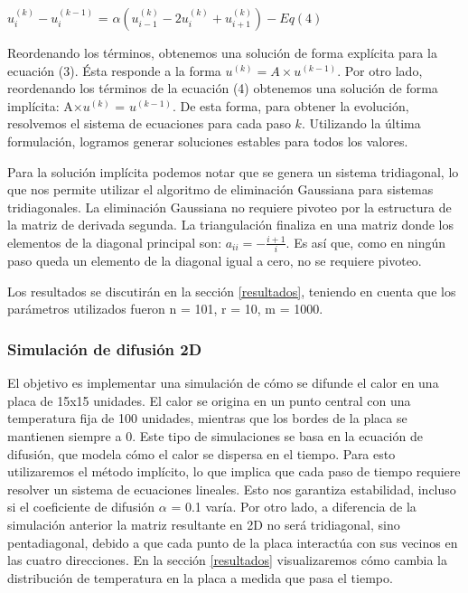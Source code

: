     \begin{center}
      $u_i^{(k)} - u_i^{(k-1)}$ = $\alpha(u_{i-1}^{(k)} - 2u_i^{(k)} + u_{i+1}^{(k)}) - Eq (4)$
    \end{center}

    Reordenando los términos, obtenemos una solución de forma explícita para la ecuación (3). Ésta responde a la forma $u^{(k)} = A \times u^{(k-1)}$. Por otro lado, reordenando los términos de la ecuación (4) obtenemos una solución de forma implícita: A$\times u^{(k)}$ = $u^{(k-1)}$. De esta forma, para obtener la evolución, resolvemos el sistema de ecuaciones para cada paso $k$.
    Utilizando la última formulación, logramos generar soluciones estables para todos los valores.

    Para la solución implícita podemos notar que se genera un sistema tridiagonal, lo que nos permite utilizar el algoritmo de eliminación Gaussiana para sistemas tridiagonales. La eliminación Gaussiana no requiere pivoteo por la estructura de la matriz de derivada segunda. La triangulación finaliza en una matriz donde los elementos de la diagonal principal son: $a_{ii} = - \frac{i+1}{i}$. 
    Es así que, como en ningún paso queda un elemento de la diagonal igual a cero, no se requiere pivoteo.\par
    Los resultados se discutirán en la sección \ref{resultados}, teniendo en cuenta que los parámetros utilizados fueron n = 101, r = 10, m = 1000.


    \subsubsection{Simulación de difusión 2D}
     El objetivo es implementar una simulación de cómo se difunde el calor en una placa de 15x15 unidades. El calor se origina en un punto central con una temperatura fija de 100 unidades, mientras que los bordes de la placa se mantienen siempre a 0. Este tipo de simulaciones se basa en la ecuación de difusión, que modela cómo el calor se dispersa en el tiempo.
     Para esto utilizaremos el método implícito, lo que implica que cada paso de tiempo requiere resolver un sistema de ecuaciones lineales. Esto nos garantiza estabilidad, incluso si el coeficiente de difusión $\alpha$ = 0.1 varía.
    Por otro lado, a diferencia de la simulación anterior la matriz resultante en 2D no será tridiagonal, sino pentadiagonal, debido a que cada punto de la placa interactúa con sus vecinos en las cuatro direcciones.
    En la sección \ref{resultados} visualizaremos cómo cambia la distribución de temperatura en la placa a medida que pasa el tiempo.

\fi